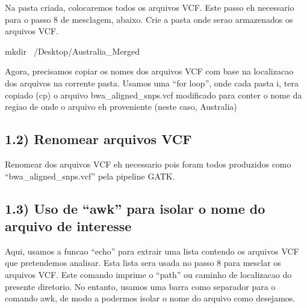 \documentclass[
]{article}
\newenvironment{Shaded}{\begin{snugshade}}{\end{snugshade}}
\newcommand{\ExtensionTok}[1]{#1}
\newcommand{\FunctionTok}[1]{\textcolor[rgb]{0.00,0.00,0.00}{#1}}
\newcommand{\KeywordTok}[1]{\textcolor[rgb]{0.13,0.29,0.53}{\textbf{#1}}}
\newcommand{\NormalTok}[1]{#1}
\newcommand{\StringTok}[1]{\textcolor[rgb]{0.31,0.60,0.02}{#1}}
\newcommand{\VariableTok}[1]{\textcolor[rgb]{0.00,0.00,0.00}{#1}}
\begin{document}
Na pasta criada, colocaremos todos os arquivos VCF. Este passo eh
necessario para o passo 8 de mesclagem, abaixo. Crie a pasta onde serao
armazenados os arquivos VCF.

\begin{Shaded}
\begin{Highlighting}[]
\FunctionTok{mkdir}\NormalTok{ ~/Desktop/Australia_Merged}
\end{Highlighting}
\end{Shaded}

Agora, precisamos copiar os nomes dos arquivos VCF com base na
localizacao dos arquivos na corrente pasta. Usamos uma ``for loop'',
onde cada pasta i, tera copiado (cp) o arquivo bwa\_aligned\_snps.vcf
modificado para conter o nome da regiao de onde o arquivo eh proveniente
(neste caso, Australia)

\hypertarget{renomear-arquivos-vcf}{%
\subsection{1.2) Renomear arquivos VCF}\label{renomear-arquivos-vcf}}

Renomear dos arquivos VCF eh necessario pois foram todos produzidos como
``bwa\_aligned\_snps.vcf'' pela pipeline GATK.

\begin{Shaded}
\end{Shaded}

\hypertarget{uso-de-awk-para-isolar-o-nome-do-arquivo-de-interesse}{%
\subsection{1.3) Uso de ``awk'' para isolar o nome do arquivo de
interesse}\label{uso-de-awk-para-isolar-o-nome-do-arquivo-de-interesse}}

Aqui, usamos a funcao ``echo'' para extrair uma lista contendo os
arquivos VCF que pretendemos analisar. Esta lista sera usada no passo 8
para mesclar os arquivos VCF. Este comando imprime o ``path'' ou caminho
de localizacao do presente diretorio. No entanto, usamos uma barra como
separador para o comando awk, de modo a podermos isolar o nome do
arquivo como desejamos.
\end{document}
